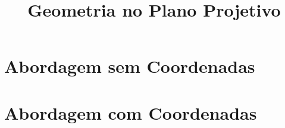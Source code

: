 \documentclass{scrbook}
\title{Geometria no Plano Projetivo}
\author{}
\date{}
\theoremstyle{definition}
\theoremstyle{remark}
\begin{document}
	\maketitle

	\tableofcontents

	

	\part{Abordagem sem Coordenadas}


	\part{Abordagem com Coordenadas}

	
	
	

	\printbibliography
\end{document}
